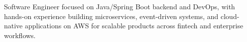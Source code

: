 Software Engineer focused on Java/Spring Boot backend and DevOps, with hands-on experience building microservices, event-driven systems, and cloud-native applications on AWS for scalable products across fintech and enterprise workflows.
